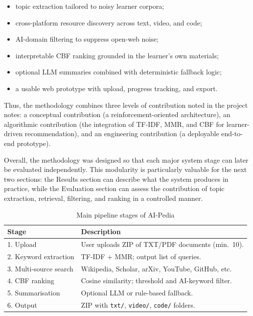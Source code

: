 \documentclass[10pt,journal,compsoc]{IEEEtran}
\begin{document}
\begin{itemize}
\item topic extraction tailored to noisy learner corpora;
\item cross-platform resource discovery across text, video, and code;
\item AI-domain filtering to suppress open-web noise;
\item interpretable CBF ranking grounded in the learner's own materials;
\item optional LLM summaries combined with deterministic fallback logic;
\item a usable web prototype with upload, progress tracking, and export.
\end{itemize}

Thus, the methodology combines three levels of contribution noted in the project notes: a conceptual contribution (a reinforcement-oriented architecture), an algorithmic contribution (the integration of TF-IDF, MMR, and CBF for learner-driven recommendation), and an engineering contribution (a deployable end-to-end prototype).

Overall, the methodology was designed so that each major system stage can later be evaluated independently. This modularity is particularly valuable for the next two sections: the Results section can describe what the system produces in practice, while the Evaluation section can assess the contribution of topic extraction, retrieval, filtering, and ranking in a controlled manner.

\begin{table}[!ht]
\caption{Main pipeline stages of AI-Pedia}
\label{tab:related_work_comparison}
\centering
\footnotesize
\renewcommand{\arraystretch}{1.2}
\begin{tabular}{@{}p{}p{}@{}}
\hline\hline
Stage & Description\\
\hline
1. Upload & User uploads ZIP of TXT/PDF documents (min.\ 10).\\
2. Keyword extraction & TF-IDF + MMR; output list of queries.\\
3. Multi-source search & Wikipedia, Scholar, arXiv, YouTube, GitHub, etc.\\
4. CBF ranking & Cosine similarity; threshold and AI-keyword filter.\\
5. Summarisation & Optional LLM or rule-based fallback.\\
6. Output & ZIP with \texttt{txt/}, \texttt{video/}, \texttt{code/} folders.\\
\hline\hline
\end{tabular}
\end{table}
\end{document}

